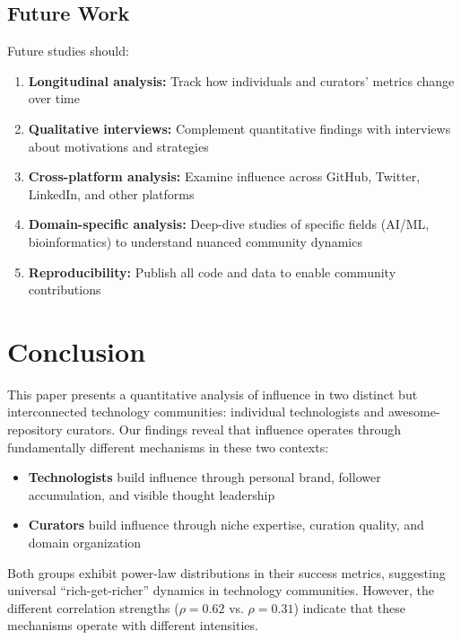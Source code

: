 \documentclass[11pt]{article}
\begin{document}
\subsection{Future Work}

Future studies should:

\begin{enumerate}
    \item \textbf{Longitudinal analysis:} Track how individuals and curators' metrics change over time
    \item \textbf{Qualitative interviews:} Complement quantitative findings with interviews about motivations and strategies
    \item \textbf{Cross-platform analysis:} Examine influence across GitHub, Twitter, LinkedIn, and other platforms
    \item \textbf{Domain-specific analysis:} Deep-dive studies of specific fields (AI/ML, bioinformatics) to understand nuanced community dynamics
    \item \textbf{Reproducibility:} Publish all code and data to enable community contributions
\end{enumerate}


\section{Conclusion}

This paper presents a quantitative analysis of influence in two distinct but interconnected technology communities: individual technologists and awesome-repository curators. Our findings reveal that influence operates through fundamentally different mechanisms in these two contexts:

\begin{itemize}
    \item \textbf{Technologists} build influence through personal brand, follower accumulation, and visible thought leadership
    \item \textbf{Curators} build influence through niche expertise, curation quality, and domain organization
\end{itemize}

Both groups exhibit power-law distributions in their success metrics, suggesting universal ``rich-get-richer'' dynamics in technology communities. However, the different correlation strengths ($\rho = 0.62$ vs. $\rho = 0.31$) indicate that these mechanisms operate with different intensities.
\end{document}
